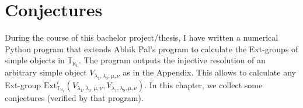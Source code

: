 \documentclass[openany, a4paper]{amsbook}
\newtheorem{rmk}[thm]{Remark}
\theoremstyle{definition}
\newtheorem{exmp}[thm]{Example}
\numberwithin{equation}{chapter}
\newcommand{\T}[1]{{\mathbb{T}}_{\aleph_{#1}}}
\newcommand{\Ext}[4]{\mathrm{Ext}^{#1}_{#2}({#3}, {#4})}
\begin{document}

\chapter{Conjectures}

During the course of this bachelor project/thesis, I have written a numerical Python program that extends {Abhik Pal}'s program \cite[]{pal} to calculate the Ext-groups of simple objects in $\T{1}$. The program outputs the injective resolution of an arbitrary simple object $V_{\lambda_1, \lambda_0, \mu, \nu}$ as in the Appendix. This allows to calculate any Ext-group $\Ext{i}{\T{1}}{V_{\lambda_1, \lambda_0, \mu, \nu}}{V_{\lambda_1, \lambda_0, \mu, \nu}}$. In this chapter, we collect some conjectures (verified by that program). 
\end{document}
